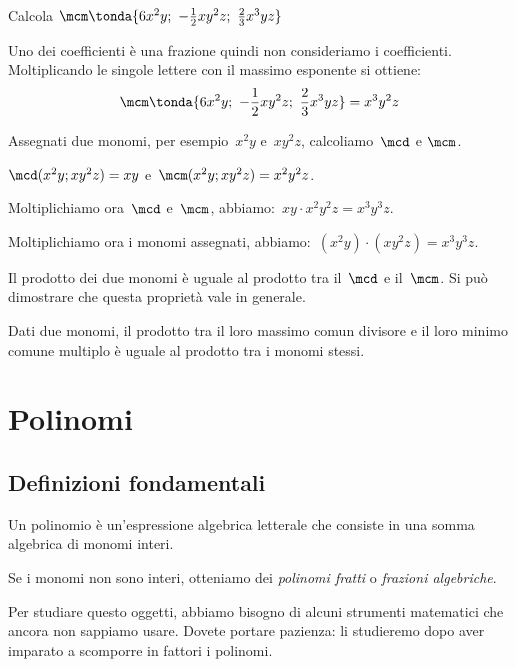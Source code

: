  \begin{esempio}
Calcola \(\mcm \tonda{6x^{2}y;~-\frac{1}{2}xy^{2}z;~\frac{2}{3}x^{3}yz}\)

Uno dei coefficienti è una frazione quindi non consideriamo i coefficienti.
Moltiplicando le singole lettere con il massimo esponente si ottiene:
\[\mcm \tonda{6x^{2}y;~-\frac{1}{2}xy^{2}z;~\frac{2}{3}x^{3}yz} = 
x^{3}y^{2}z\]
 \end{esempio}

Assegnati due monomi, per esempio~\(x^{2}y\) e~\(xy^{2}z\),
calcoliamo~\(\mcd\) e \(\mcm\).

\(\mcd (x^{2}y;xy^{2}z)=xy\) e~\(\mcm (x^{2}y;xy^{2}z)=x^{2}y^{2}z\).

Moltiplichiamo ora~\(\mcd\) e~\(\mcm\), abbiamo:~\(xy\cdot x^{2}y^{2}z= 
x^{3}y^{3}z.\)

Moltiplichiamo ora i monomi assegnati, abbiamo:~\((x^{2}y)\cdot 
(xy^{2}z)=x^{3}y^{3}z.\)

Il prodotto dei due monomi è uguale al prodotto tra il~\(\mcd\) e
il~\(\mcm\). Si può dimostrare che questa proprietà vale in generale.

\begin{proprieta}
 Dati due monomi, il prodotto tra il loro massimo comun
divisore e il loro minimo comune multiplo è uguale al prodotto tra i
monomi stessi.
\end{proprieta}


\section{Polinomi}

\subsection{Definizioni fondamentali}
\label{subsec:10_poli_definizioni}

\begin{definizione}
Un polinomio è un'espressione algebrica letterale che consiste in una somma 
algebrica di monomi interi.
\end{definizione}

\begin{osservazione}
Se i monomi non sono interi, otteniamo dei \emph{polinomi fratti} o 
\emph{frazioni algebriche}.

Per studiare questo oggetti, abbiamo bisogno di alcuni strumenti matematici 
che ancora non sappiamo usare. 
Dovete portare pazienza: li studieremo dopo aver imparato a scomporre in 
fattori i polinomi.
\end{osservazione}


